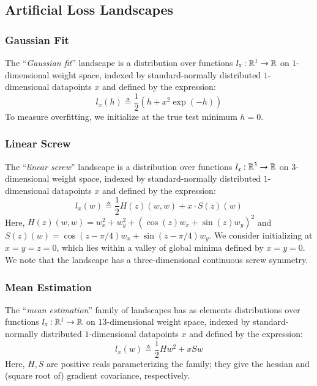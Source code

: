 \documentclass{article}
\theoremstyle{plain}
\theoremstyle{definition}
\newcommand{\wrap}[1]{\left(#1\right)}
\begin{document}
    \subsection{Artificial Loss Landscapes}
        \subsubsection*{Gaussian Fit}
            The ``\emph{Gaussian fit}'' landscape is a distribution over 
            functions $l_x:\mathbb{R}^1\to \mathbb{R}$ on $1$-dimensional weight space,
            indexed by standard-normally distributed
            $1$-dimensional datapoints $x$ and defined by the expression:
            $$
                l_x(h)
                \triangleq
                \frac{1}{2} \wrap{h + x^2 \exp(-h)}
            $$
            To measure overfitting, we initialize at the true test minimum
            $h=0$.
            
        \subsubsection*{Linear Screw}
            The ``\emph{linear screw}'' landscape is a distribution over 
            functions $l_x:\mathbb{R}^3\to \mathbb{R}$ on $3$-dimensional weight space,
            indexed by standard-normally distributed
            $1$-dimensional datapoints $x$ and defined by the expression:
            $$
                l_x(w)
                \triangleq
                \frac{1}{2} H(z)(w, w) + x \cdot S(z)(w)  
            $$
            Here, $H(z)(w, w) = w_x^2 + w_y^2 + (\cos(z) w_x + \sin(z) w_y)^2$
            and   $S(z)(w)    = \cos(z-\pi/4) w_x + \sin(z-\pi/4) w_y$.
            We consider initializing at $x=y=z=0$, which lies within a valley
            of global minima defined by $x=y=0$.  We note that the landscape 
            has a three-dimensional continuous screw symmetry. 
            
        \subsubsection*{Mean Estimation}
            The ``\emph{mean estimation}'' family of landscapes has as elements
            distributions over functions $l_x:\mathbb{R}^1\to \mathbb{R}$ on $13$-dimensional
            weight space, indexed by standard-normally distributed
            $1$-dimensional datapoints $x$ and defined by the expression:
            $$
                l_x(w)
                \triangleq
                \frac{1}{2} H w^2 + x S w
            $$
            Here, $H, S$ are positive reals parameterizing the family; they
            give the hessian and (square root of) gradient covariance,
            respectively.
\end{document}

